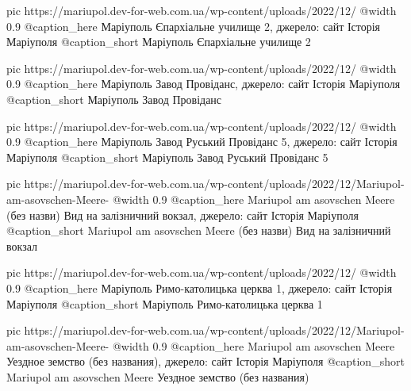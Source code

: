 	pic https://mariupol.dev-for-web.com.ua/wp-content/uploads/2022/12/%
	@width 0.9
	@caption_here Маріуполь Єпархіальне училище 2, джерело: сайт Історія Маріуполя
	@caption_short Маріуполь Єпархіальне училище 2

	pic https://mariupol.dev-for-web.com.ua/wp-content/uploads/2022/12/%
	@width 0.9
	@caption_here Маріуполь Завод Провіданс, джерело: сайт Історія Маріуполя
	@caption_short Маріуполь Завод Провіданс

	pic https://mariupol.dev-for-web.com.ua/wp-content/uploads/2022/12/%
	@width 0.9
	@caption_here Маріуполь Завод Руський Провіданс 5, джерело: сайт Історія Маріуполя
	@caption_short Маріуполь Завод Руський Провіданс 5

	pic https://mariupol.dev-for-web.com.ua/wp-content/uploads/2022/12/Mariupol-am-asovschen-Meere-%
	@width 0.9
	@caption_here Mariupol am asovschen Meere (без назви) Вид на залізничний вокзал, джерело: сайт Історія Маріуполя
	@caption_short Mariupol am asovschen Meere (без назви) Вид на залізничний вокзал

	pic https://mariupol.dev-for-web.com.ua/wp-content/uploads/2022/12/%
	@width 0.9
	@caption_here Маріуполь Римо-католицька церква 1, джерело: сайт Історія Маріуполя
	@caption_short Маріуполь Римо-католицька церква 1

	pic https://mariupol.dev-for-web.com.ua/wp-content/uploads/2022/12/Mariupol-am-asovschen-Meere-%
	@width 0.9
	@caption_here Mariupol am asovschen Meere Уездное земство (без названия), джерело: сайт Історія Маріуполя
	@caption_short Mariupol am asovschen Meere Уездное земство (без названия)

